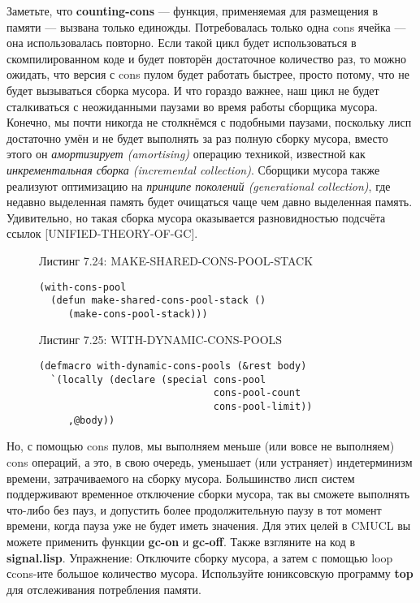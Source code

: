 Заметьте, что \textbf{counting-cons} --- функция, применяемая для размещения в памяти --- вызвана только единожды. Потребовалась только одна cons ячейка --- она использовалась повторно. Если такой цикл будет использоваться в скомпилированном коде и будет повторён достаточное количество раз, то можно ожидать, что версия с cons пулом будет работать быстрее, просто потому, что не будет вызываться сборка мусора. И что гораздо важнее, наш цикл не будет сталкиваться с неожиданными паузами во время работы сборщика мусора. Конечно, мы почти никогда не столкнёмся с подобными паузами, поскольку лисп достаточно умён и не будет выполнять за раз полную сборку мусора, вместо этого он \emph{амортизирует (amortising)} операцию техникой, известной как \emph{инкрементальная сборка (incremental collection)}. Сборщики мусора также реализуют оптимизацию на \emph{принципе поколений (generational collection)}, где недавно выделенная память будет очищаться чаще чем давно выделенная память. Удивительно, но такая сборка мусора оказывается разновидностью подсчёта ссылок [UNIFIED-THEORY-OF-GC].

\begin{figure}Листинг 7.24: MAKE-SHARED-CONS-POOL-STACK\label{listing_7.24}
\listbegin
\begin{verbatim}
(with-cons-pool
  (defun make-shared-cons-pool-stack ()
     (make-cons-pool-stack)))
\end{verbatim}
\listend
\end{figure}

\begin{figure}Листинг 7.25: WITH-DYNAMIC-CONS-POOLS\label{listing_7.25}
\listbegin
\begin{verbatim}
(defmacro with-dynamic-cons-pools (&rest body)
  `(locally (declare (special cons-pool
                              cons-pool-count
                              cons-pool-limit))
     ,@body))
\end{verbatim}
\listend
\end{figure}

Но, с помощью cons пулов, мы выполняем меньше (или вовсе не выполняем) cons операций, а это, в свою очередь, уменьшает (или устраняет) индетерминизм времени, затрачиваемого на сборку мусора. Большинство лисп систем поддерживают временное отключение сборки мусора, так вы сможете выполнять что-либо без пауз, и допустить более продолжительную паузу в тот момент времени, когда пауза уже не будет иметь значения. Для этих целей в CMUCL вы можете применить функции \textbf{gc-on} и \textbf{gc-off}. Также взгляните на код в \textbf{signal.lisp}. Упражнение: Отключите сборку мусора, а затем с помощью loop сcons-ите большое количество мусора. Используйте юниксовскую программу \textbf{top} для отслеживания потребления памяти.

